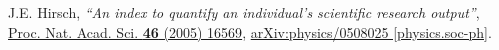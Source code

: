 
\begin{thebibliography}{99}
  J.E. Hirsch,
  \textit{``An index to quantify an individual's scientific research output''},
  \href{https://dx.doi.org/10.1073/pnas.0507655102}
   {Proc. Nat. Acad. Sci. \textbf{46} (2005) 16569},
  \href{https://arxiv.org/abs/physics/0508025}{arXiv:physics/0508025 [physics.soc-ph]}.
\end{thebibliography}

